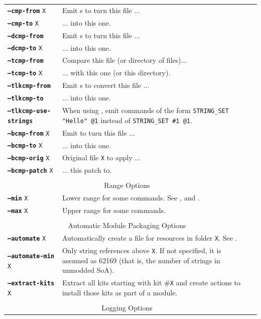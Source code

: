 \documentclass{article}
\def\ttref#1{\ahrefloc{#1}{\tt #1}}
\def\DEFINE#1{{\tt \bf #1}\label{#1}\index{#1}}
\def\t#1{{\tt #1}}
\begin{document}
\begin{tabular}{lp{10in}|p{10in}}
\DEFINE{--cmp-from} \t{X}&	Emit \ttref{WRITE_BYTE}s to turn this file ... \\
\DEFINE{--cmp-to}   \t{X}&	... into this one. \\
\DEFINE{--dcmp-from}\t{X}&	Emit \ttref{REPLACE}s to turn this \ttref{DLG} file ... \\
\DEFINE{--dcmp-to}  \t{X}&	... into this one. \\
\DEFINE{--tcmp-from}\t{X}&	Compare this \ttref{TRA} file (or directory of \ttref{TRA} files)... \\
\DEFINE{--tcmp-to}  \t{X}&	... with this one (or this directory). \\
\DEFINE{--tlkcmp-from}\t{X}&	Emit \ttref{STRING_SET}s to convert this \ttref{TLK} file ... \\
\DEFINE{--tlkcmp-to}\t{X}&	... into this one. \\
\DEFINE{--tlkcmp-use-strings} & When using \ttref{--tlkcmp-from}, emit
commands of the form \t{STRING_SET "Hello" @1} instead of \t{STRING_SET \#1
@1}. \\
\DEFINE{--bcmp-from}  \t{X}&      Emit \ttref{APPLY_BCS_PATCH} to turn this
\ttref{BCS} file ... \\
\DEFINE{--bcmp-to}    \t{X}&      ... into this one. \\
\DEFINE{--bcmp-orig}  \t{X}&      Original file \t{X} to apply ... \\
\DEFINE{--bcmp-patch} \t{X}&      ... this patch to. \\
\\
\multicolumn{2}{c}{ \color{red} Range Options} \\
\DEFINE{--min} \t{X} & Lower range for some commands. See
\ttref{--traify-tlk}, \ttref{--tlkcmp-from} and \ttref{--string}.  \\
\DEFINE{--max} \t{X} & Upper range for some commands. \\
\\
\multicolumn{2}{c}{ \color{red} Automatic Module Packaging Options} \\
\DEFINE{--automate} \t{X}&   Automatically create a \ttref{TP2} file for resources in folder \t{X}. See \ttref{--out}. \\
\DEFINE{--automate-min} \t{X}& Only \ttref{--automate} string references above \t{X}. If not specified, it is assumed as 62169 (that is, the number of strings in unmodded SoA). \\
\DEFINE{--extract-kits} \t{X} & Extract all kits starting with kit \#\t{X}
and create \ttref{TP2} actions to install those kits as part of a module.  \\
\\
\multicolumn{2}{c}{ \color{red} Logging Options } \\


\end{tabular}
\end{document}
